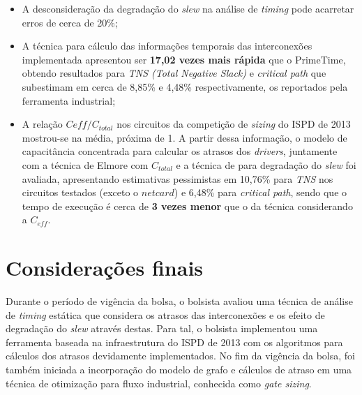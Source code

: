 \documentclass[
	12pt,				%
	openright,			%
	twoside,			%
	a4paper,			%
	english,			%
	french,				%
	spanish,			%
	brazil,				%
	]{abntex2}
\begin{document}
\begin{itemize}
	\item A desconsideração da degradação do \textit{slew} na análise de \textit{timing} pode acarretar erros de cerca de 20\%;
	\item A técnica para cálculo das informações temporais das interconexões implementada apresentou ser \textbf{17,02 vezes mais rápida} que o PrimeTime, obtendo resultados para \textit{TNS (Total Negative Slack)} e \textit{critical path} que subestimam em cerca de 8,85\% e 4,48\% respectivamente, os reportados pela ferramenta industrial;
	\item A relação $C{eff} / C_{total}$ nos circuitos da competição de \textit{sizing} do ISPD de 2013 mostrou-se na média, próxima de 1. A partir dessa informação, o modelo de capacitância concentrada para calcular os atrasos dos \textit{drivers}, juntamente com a técnica de Elmore com $C_{total}$ e a técnica de  para degradação do \textit{slew} foi avaliada, apresentando estimativas pessimistas em 10,76\% para \textit{TNS} nos circuitos testados (exceto o $netcard$) e 6,48\% para \textit{critical path}, sendo que o tempo de execução é cerca de \textbf{3 vezes menor} que o da técnica considerando a $C_{eff}$. 
\end{itemize}


\chapter*[Considerações finais]{Considerações finais}

Durante o período de vigência da bolsa, o bolsista avaliou uma técnica de análise de \textit{timing} estática que considera os atrasos das interconexões e os efeito de degradação do \textit{slew} através destas. Para tal, o bolsista implementou uma ferramenta baseada na infraestrutura do ISPD de 2013 \cite{Contest2013} com os algoritmos para cálculos dos atrasos devidamente implementados. No fim da vigência da bolsa, foi também iniciada a incorporação do modelo de grafo e cálculos de atraso em uma técnica de otimização para fluxo industrial, conhecida como \textit{gate sizing}.



\postextual


\end{document}
